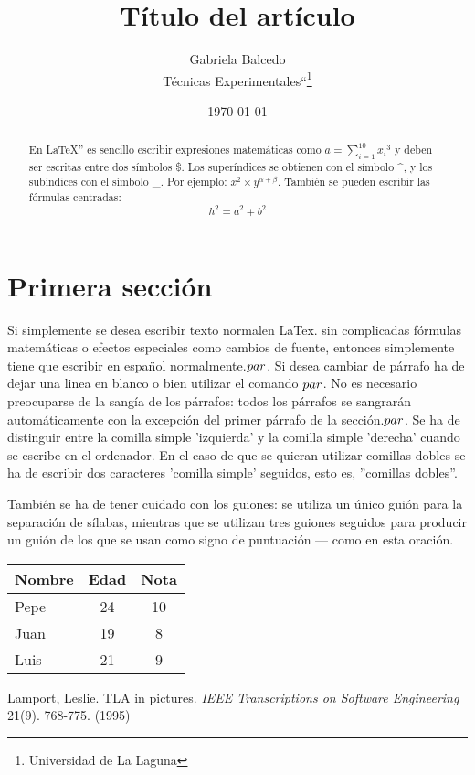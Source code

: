 \documentclass[a4paper,12pt]{article}
\begin{document}
\title{Título del artículo}
\author{Gabriela Balcedo\\
    Técnicas Experimentales``\footnote{Universidad de La Laguna}
    }
\date{\today}
\maketitle
\begin{abstract}
 En \LaTeX{}''\cite{Lam:86} es sencillo escribir expresiones
 matemáticas como $a=\sum_{i=1}^{10} {x_i}^{3}$
 y deben ser escritas entre dos símbolos \$.
 Los superíndices se obtienen con el símbolo \^{}, y
 los subíndices con el símbolo \_.
 Por ejemplo: $x^2\times y^{\alpha + \beta}$.
 También se pueden escribir las fórmulas centradas:
 \[h^2=a^2 + b^2\]
\end{abstract}

\section{Primera sección}
Si simplemente se desea escribir texto normalen LaTex.
sin complicadas f\'ormulas matem\'aticas o efectos especiales
como cambios de fuente, entonces simplemente tiene que escribir
en espa\"nol normalmente.$\\par$.
Si desea cambiar de párrafo ha de dejar una linea en blanco o bien
utilizar el comando $\\par$.
No es necesario preocuparse de la sangía de los párrafos:
todos los párrafos se sangrarán automáticamente con la excepción 
del primer párrafo de la sección.$\\par$.
Se ha de distinguir entre la comilla simple 'izquierda'
y la comilla simple 'derecha' cuando se escribe en el ordenador.
En el caso de que se quieran utilizar comillas dobles se ha de
escribir dos caracteres 'comilla simple' seguidos, esto es,
''comillas dobles''.

También se ha de tener cuidado con los guiones: se utiliza un único
guión para la separación de sílabas, mientras que se utilizan
tres guiones seguidos para producir un guión de los que se usan
como signo de puntuación --- como en esta oración.


\bigskip
\begin{tabular}{|l|c|c|}
 \hline
  Nombre & Edad & Nota\\ \hline
  Pepe & 24 & 10 \\ \hline
  Juan & 19 & 8 \\ \hline
  Luis & 21 & 9 \\ \hline
\end{tabular}



\begin{thebibliography}{00}
    Lamport, Leslie.
    TLA in pictures.
    \emph{IEEE Transcriptions on Software Engineering}
    21(9). 768-775.
    (1995)
    
\end{thebibliography}
\end{document}
